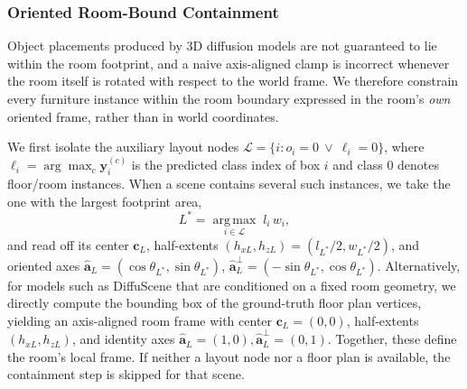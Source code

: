 \subsubsection{Oriented Room-Bound Containment}
\label{sec:method:room_containment}

Object placements produced by 3D diffusion models are not guaranteed to lie within the room footprint, and a naive axis-aligned clamp is incorrect whenever the room itself is rotated with respect to the world frame. We therefore constrain every furniture instance within the room boundary expressed in the room's \emph{own} oriented frame, rather than in world coordinates.

We first isolate the auxiliary layout nodes $\mathcal{L} = \{i : o_i = 0 \ \lor\ \ell_i = 0\}$, where $\ell_i = \arg\max_c \mathbf{y}_i^{(c)}$ is the predicted class index of box $i$ and class $0$ denotes floor/room instances. When a scene contains several such instances, we take the one with the largest footprint area,
\begin{equation}
L^{\ast} = \operatorname*{arg\,max}_{i \in \mathcal{L}} \; l_i \, w_i,
\label{eq:room_select}
\end{equation}
and read off its center $\mathbf{c}_L$, half-extents $(h_{xL}, h_{zL}) = (l_{L^{\ast}}/2, w_{L^{\ast}}/2)$, and oriented axes $\hat{\mathbf{a}}_L = (\cos\theta_{L^{\ast}}, \sin\theta_{L^{\ast}})$, $\hat{\mathbf{a}}_L^{\perp} = (-\sin\theta_{L^{\ast}}, \cos\theta_{L^{\ast}})$. Alternatively, for models such as DiffuScene that are conditioned on a fixed room geometry, we directly compute the bounding box of the ground-truth floor plan vertices, yielding an axis-aligned room frame with center $\mathbf{c}_L = (0, 0)$, half-extents $(h_{xL}, h_{zL})$, and identity axes $\hat{\mathbf{a}}_L = (1, 0), \hat{\mathbf{a}}_L^{\perp} = (0, 1)$. Together, these define the room's local frame. If neither a layout node nor a floor plan is available, the containment step is skipped for that scene.


